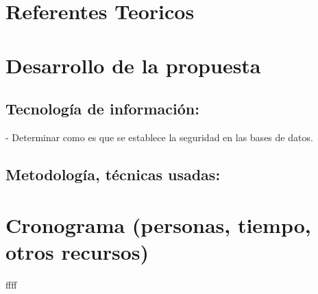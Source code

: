 \documentclass[%
 reprint,
 amsmath,amssymb,
 aps,
]{revtex4-1}
\begin{document}
\section {Referentes Teoricos}

\section {Desarrollo de la propuesta}

\subsection{Tecnología de información:}
-  Determinar como es que se establece la seguridad en las bases de datos.
\subsection{Metodología, técnicas usadas:}



\section {Cronograma (personas, tiempo, otros recursos)}

ffff





\end{document}
